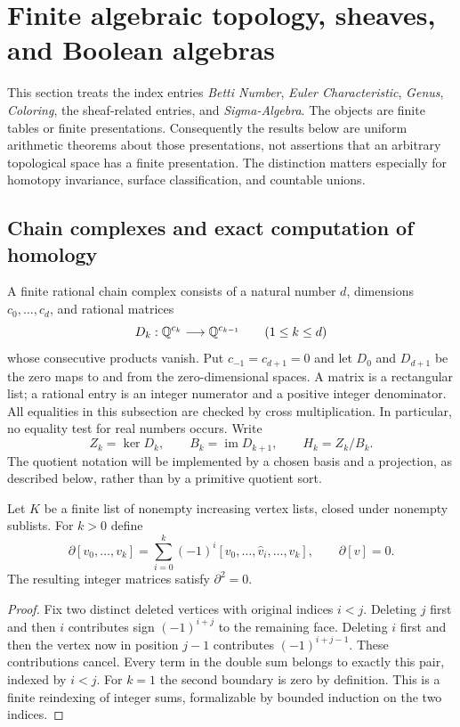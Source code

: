 \section{Finite algebraic topology, sheaves, and Boolean algebras}
\label{sec:algebraic}

This section treats the index entries \emph{Betti Number}, \emph{Euler
Characteristic}, \emph{Genus}, \emph{Coloring}, the sheaf-related entries, and
\emph{Sigma-Algebra}.  The objects are finite tables or finite presentations.
Consequently the results below are uniform arithmetic theorems about those
presentations, not assertions that an arbitrary topological space has a
finite presentation.  The distinction matters especially for homotopy
invariance, surface classification, and countable unions.

\subsection{Chain complexes and exact computation of homology}

A finite rational chain complex consists of a natural number $d$, dimensions
$c_0,\ldots,c_d$, and rational matrices
\[
 D_k:\mathbb Q^{c_k}\longrightarrow\mathbb Q^{c_{k-1}}
 \qquad(1\leq k\leq d)
\]
whose consecutive products vanish.  Put $c_{-1}=c_{d+1}=0$ and let $D_0$ and
$D_{d+1}$ be the zero maps to and from the zero-dimensional spaces.  A matrix
is a rectangular list; a rational entry is an integer numerator and a
positive integer denominator.  All equalities in this subsection are
checked by cross multiplication.  In particular, no equality test for real
numbers occurs.  Write
\[
 Z_k=\ker D_k,\qquad B_k=\operatorname{im}D_{k+1},\qquad
 H_k=Z_k/B_k.
\]
The quotient notation will be implemented by a chosen basis and a projection,
as described below, rather than by a primitive quotient sort.

\begin{proposition}
\label{prop:boundary-square}
Let $K$ be a finite list of nonempty increasing vertex lists, closed under
nonempty sublists.  For $k>0$ define
\[
 \partial[v_0,\ldots,v_k]
   =\sum_{i=0}^{k}(-1)^i[v_0,\ldots,\widehat v_i,\ldots,v_k],
 \qquad \partial[v]=0.
\]
The resulting integer matrices satisfy $\partial^2=0$.
\end{proposition}
\begin{proof}
Fix two distinct deleted vertices with original indices $i<j$.  Deleting
$j$ first and then $i$ contributes sign $(-1)^{i+j}$ to the remaining
face.  Deleting $i$ first and then the vertex now in position $j-1$
contributes $(-1)^{i+j-1}$.  These contributions cancel.  Every term in the
double sum belongs to exactly this pair, indexed by $i<j$.  For $k=1$ the
second boundary is zero by definition.  This is a finite reindexing of
integer sums, formalizable by bounded induction on the two indices.
\end{proof}

